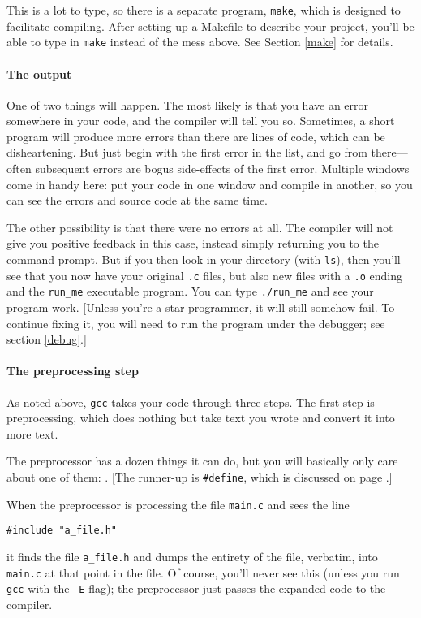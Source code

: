 \documentclass[12pt]{article}
\makeatletter
\def\ind#1{\index{#1}#1}
\def\ttind#1{\index{#1@{\tt #1}}{\tt #1}}
\makeatother
\begin{document}
This is a lot to type, so there is a separate program, {\tt make},
which is designed to facilitate compiling. After setting up a Makefile
to describe your project, you'll be able to type in {\tt make} instead
of the mess above. See Section \ref{make} for details.

\paragraph{The output} One of two things will happen. The most likely is that you have an error somewhere
in your code, and the compiler will tell you so. Sometimes, a short program will produce more errors than
there are lines of code, which can be disheartening. But just begin with the first error in the list, and
go from there---often subsequent errors are bogus side-effects of the first error. Multiple windows come in handy here:
put your code in one window and compile in another, so you can see the errors and source code at the same time.

The other possibility is that there were no errors at all. The compiler will not give you positive feedback
in this case, instead simply returning you to the command prompt. But if you then look in your directory
(with {\tt ls}), then you'll see that you now have your original {\tt .c}
files, but also new files with a {\tt .o} ending and the {\tt run\_me}
executable program. You can type {\tt ./run\_me} and see your program
work. [Unless you're a star programmer, it will still somehow fail. To
continue fixing it, you will need to run the program under the debugger;
see section \ref{debug}.]

\paragraph{The preprocessing step}
As noted above, {\tt gcc} takes your code through three steps.
The first step is \ind{preprocessing},
which does nothing but take text you wrote and convert it into more text.

The preprocessor has a dozen things it can do, but you will basically only care about one of them: \ttind{\#include}. 
[The runner-up is {\tt \#define}, which is discussed on page \pageref{macros}.]

When the preprocessor is processing the file {\tt main.c} and sees the line
\begin{verbatim}
#include "a_file.h"
\end{verbatim}
it finds the file {\tt a\_file.h} and dumps the entirety of the file,
verbatim, into {\tt main.c} at that point in the file. Of course, you'll
never see this (unless you run {\tt gcc} with the {\tt -E} flag); the
preprocessor just passes the expanded code to the compiler.
\end{document}
